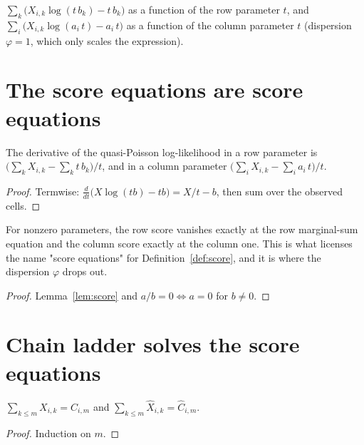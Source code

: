 \begin{definition}\label{def:qll}\leanok
{}
$\sum_{k} \big(X_{i,k}\log(t\,b_k) - t\,b_k\big)$ as a function of the row parameter
$t$, and $\sum_{i} \big(X_{i,k}\log(a_i\,t) - a_i\,t\big)$ as a function of the column
parameter $t$ (dispersion $\varphi = 1$, which only scales the expression).
\end{definition}

\section{The score equations are score equations}

\begin{lemma}\label{lem:score}\leanok
{}
The derivative of the quasi-Poisson log-likelihood in a row parameter is
$\big(\sum_k X_{i,k} - \sum_k t\,b_k\big)/t$, and in a column parameter
$\big(\sum_i X_{i,k} - \sum_i a_i\,t\big)/t$.
\end{lemma}
\begin{proof}\leanok
Termwise: $\frac{d}{dt}\big(X\log(tb) - tb\big) = X/t - b$, then sum over the observed
cells.
\end{proof}

\begin{lemma}\label{lem:scoreZero}\leanok
{}
For nonzero parameters, the row score vanishes exactly at the row marginal-sum equation
and the column score exactly at the column one. This is what licenses the name "score
equations" for Definition~\ref{def:score}, and it is where the dispersion $\varphi$
drops out.
\end{lemma}
\begin{proof}\leanok
Lemma~\ref{lem:score} and $a/b = 0 \iff a = 0$ for $b \ne 0$.
\end{proof}

\section{Chain ladder solves the score equations}

\begin{lemma}[Telescoping]\label{lem:telescope}\leanok
{}
$\sum_{k \le m} X_{i,k} = C_{i,m}$ and $\sum_{k \le m} \hat X_{i,k} = \hat C_{i,m}$.
\end{lemma}
\begin{proof}\leanok Induction on $m$. \end{proof}

